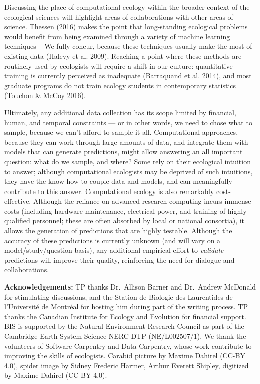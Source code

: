 \documentclass[12pt]{article}
\begin{document}
Discussing the place of computational ecology within the broader context
of the ecological sciences will highlight areas of collaborations with
other areas of science. Thessen (2016) makes the point that
long-standing ecological problems would benefit from being examined
through a variety of machine learning techniques -- We fully concur,
because these techniques usually make the most of existing data (Halevy
et al. 2009). Reaching a point where these methods are routinely used by
ecologists will require a shift in our culture: quantitative training is
currently perceived as inadequate (Barraquand et al. 2014), and most
graduate programs do not train ecology students in contemporary
statistics (Touchon \& McCoy 2016).

Ultimately, any additional data collection has its scope limited by
financial, human, and temporal constraints --- or in other words, we
need to chose what to sample, because we can't afford to sample it all.
Computational approaches, because they can work through large amounts of
data, and integrate them with models that can generate predictions,
might allow answering an all important question: what do we sample, and
where? Some rely on their ecological intuition to answer; although
computational ecologists may be deprived of such intuitions, they have
the know-how to couple data and models, and can meaningfully contribute
to this answer. Computational ecology is also remarkably cost-effective.
Although the reliance on advanced research computing incurs immense
costs (including hardware maintenance, electrical power, and training of
highly qualified personnel; these are often absorbed by local or
national consortia), it allows the generation of predictions that are
highly testable. Although the accuracy of these predictions is currently
unknown (and will vary on a model/study/question basis), any additional
empirical effort to \emph{validate} predictions will improve their
quality, reinforcing the need for dialogue and collaborations.

\textbf{Acknowledgements:} TP thanks Dr.~Allison Barner and Dr.~Andrew
McDonald for stimulating discussions, and the Station de Biologie des
Laurentides de l'Université de Montréal for hosting him during part of
the writing process. TP thanks the Canadian Institute for Ecology and
Evolution for financial support. BIS is supported by the Natural
Environment Research Council as part of the Cambridge Earth System
Science NERC DTP (NE/L002507/1). We thank the volunteers of Software
Carpentry and Data Carpentry, whose work contribute to improving the
skills of ecologists. Carabid picture by Maxime Dahirel (CC-BY 4.0),
spider image by Sidney Frederic Harmer, Arthur Everett Shipley,
digitized by Maxime Dahirel (CC-BY 4.0).
\end{document}
